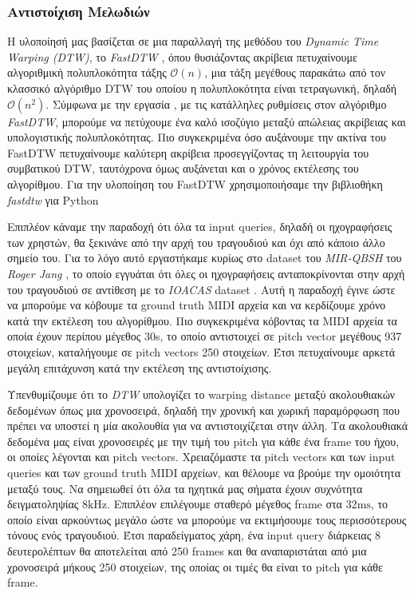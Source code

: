 \subsubsection{Αντιστοίχιση Μελωδιών}

Η υλοποίησή μας βασίζεται σε μια παραλλαγή της μεθόδου του \emph{Dynamic Time Warping (DTW)}, το \emph{FastDTW} \cite{salvador2007toward},
όπου θυσιάζοντας ακρίβεια πετυχαίνουμε αλγοριθμική πολυπλοκότητα τάξης $\mathcal{O}(n)$, μια τάξη μεγέθους παρακάτω από τον κλασσικό
αλγόριθμο DTW του οποίου η πολυπλοκότητα είναι τετραγωνική, δηλαδή $\mathcal{O}(n^2)$. Σύμφωνα με την εργασία \cite{salvador2007toward},
με τις κατάλληλες ρυθμίσεις στον αλγόριθμο \emph{FastDTW}, μπορούμε να πετύχουμε ένα καλό ισοζύγιο μεταξύ απώλειας ακρίβειας και
υπολογιστικής πολυπλοκότητας. Πιο συγκεκριμένα όσο αυξάνουμε την ακτίνα του FastDTW πετυχαίνουμε καλύτερη ακρίβεια προσεγγίζοντας τη λειτουργία του συμβατικού DTW, ταυτόχρονα όμως αυξάνεται και ο χρόνος εκτέλεσης του αλγορίθμου. Για την υλοποίηση του FastDTW χρησιμοποιήσαμε την βιβλιοθήκη \emph{fastdtw} για Python \cite{fastdtwpython}

Επιπλέον κάναμε την παραδοχή ότι όλα τα input queries, δηλαδή οι ηχογραφήσεις των
χρηστών, θα ξεκινάνε από την αρχή του τραγουδιού και όχι από κάποιο άλλο σημείο του. Για το λόγο αυτό εργαστήκαμε κυρίως στο dataset του
\emph{MIR-QBSH} του \emph{Roger Jang} \cite{jang-dataset}, το οποίο εγγυάται ότι όλες οι ηχογραφήσεις ανταποκρίνονται στην αρχή του
τραγουδιού σε αντίθεση με το \emph{IOACAS} dataset \cite{IOACAS-dataset}. Αυτή η παραδοχή έγινε ώστε να
μπορούμε να κόβουμε τα ground truth MIDI αρχεία και να κερδίζουμε χρόνο κατά την εκτέλεση του αλγορίθμου. Πιο
συγκεκριμένα κόβοντας τα MIDI αρχεία τα οποία έχουν περίπου μέγεθος 30s, το οποίο αντιστοιχεί σε pitch vector
μεγέθους 937 στοιχείων, καταλήγουμε σε pitch vectors 250 στοιχείων. Έτσι πετυχαίνουμε αρκετά μεγάλη επιτάχυνση
κατά την εκτέλεση της αντιστοίχισης.

Υπενθυμίζουμε ότι το \emph{DTW} υπολογίζει το warping distance μεταξύ ακολουθιακών δεδομένων όπως μια χρονοσειρά, δηλαδή την χρονική και
χωρική παραμόρφωση που πρέπει να υποστεί η μία ακολουθία για να αντιστοιχίζεται στην άλλη. Τα ακολουθιακά δεδομένα μας είναι χρονοσειρές
με την τιμή του pitch για κάθε ένα frame του ήχου, οι οποίες λέγονται και pitch vectors. Χρειαζόμαστε τα pitch vectors και των input queries
και των ground truth MIDI αρχείων, και θέλουμε να βρούμε την ομοιότητα μεταξύ τους. Να σημειωθεί ότι όλα τα ηχητικά μας σήματα έχουν
συχνότητα δειγματοληψίας $8 \mathrm{ kHz}$. Επιπλέον επιλέγουμε σταθερό μέγεθος frame στα $32 \mathrm{ ms}$, το οποίο είναι αρκούντως
μεγάλο ώστε να μπορούμε να εκτιμήσουμε τους περισσότερους τόνους ενός τραγουδιού. Έτσι παραδείγματος χάρη, ένα input query διάρκειας 8
δευτερολέπτων θα αποτελείται από 250 frames και θα αναπαριστάται από μια χρονοσειρά μήκους 250 στοιχείων, της οποίας οι τιμές θα είναι το
pitch για κάθε frame.
